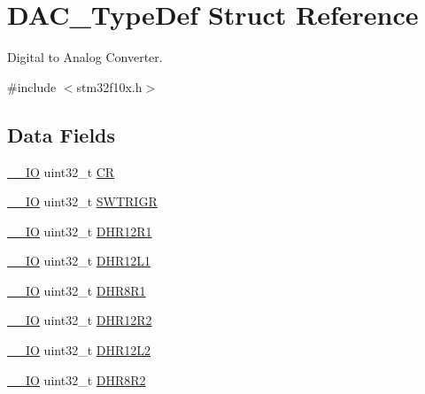 \hypertarget{struct_d_a_c___type_def}{}\section{D\+A\+C\+\_\+\+Type\+Def Struct Reference}
\label{struct_d_a_c___type_def}


Digital to Analog Converter.  




{\ttfamily \#include $<$stm32f10x.\+h$>$}

\subsection*{Data Fields}
\begin{DoxyCompactItemize}
\item 
\mbox{\hyperlink{core__sc300_8h_aec43007d9998a0a0e01faede4133d6be}{\+\_\+\+\_\+\+IO}} uint32\+\_\+t \mbox{\hyperlink{struct_d_a_c___type_def_ab40c89c59391aaa9d9a8ec011dd0907a}{CR}}
\item 
\mbox{\hyperlink{core__sc300_8h_aec43007d9998a0a0e01faede4133d6be}{\+\_\+\+\_\+\+IO}} uint32\+\_\+t \mbox{\hyperlink{struct_d_a_c___type_def_a896bbb7153af0b67ad772360feaceeb4}{S\+W\+T\+R\+I\+GR}}
\item 
\mbox{\hyperlink{core__sc300_8h_aec43007d9998a0a0e01faede4133d6be}{\+\_\+\+\_\+\+IO}} uint32\+\_\+t \mbox{\hyperlink{struct_d_a_c___type_def_ac2bb55b037b800a25852736afdd7a258}{D\+H\+R12\+R1}}
\item 
\mbox{\hyperlink{core__sc300_8h_aec43007d9998a0a0e01faede4133d6be}{\+\_\+\+\_\+\+IO}} uint32\+\_\+t \mbox{\hyperlink{struct_d_a_c___type_def_ae9028b8bcb5118b7073165fb50fcd559}{D\+H\+R12\+L1}}
\item 
\mbox{\hyperlink{core__sc300_8h_aec43007d9998a0a0e01faede4133d6be}{\+\_\+\+\_\+\+IO}} uint32\+\_\+t \mbox{\hyperlink{struct_d_a_c___type_def_ad0a200e12acad17a5c7d2059159ea7e1}{D\+H\+R8\+R1}}
\item 
\mbox{\hyperlink{core__sc300_8h_aec43007d9998a0a0e01faede4133d6be}{\+\_\+\+\_\+\+IO}} uint32\+\_\+t \mbox{\hyperlink{struct_d_a_c___type_def_a804c7e15dbb587c7ea25511f6a7809f7}{D\+H\+R12\+R2}}
\item 
\mbox{\hyperlink{core__sc300_8h_aec43007d9998a0a0e01faede4133d6be}{\+\_\+\+\_\+\+IO}} uint32\+\_\+t \mbox{\hyperlink{struct_d_a_c___type_def_a2e45f9c9d67e384187b25334ba0a3e3d}{D\+H\+R12\+L2}}
\item 
\mbox{\hyperlink{core__sc300_8h_aec43007d9998a0a0e01faede4133d6be}{\+\_\+\+\_\+\+IO}} uint32\+\_\+t \mbox{\hyperlink{struct_d_a_c___type_def_a4c435f0e34ace4421241cd5c3ae87fc2}{D\+H\+R8\+R2}}

\end{DoxyCompactItemize}
